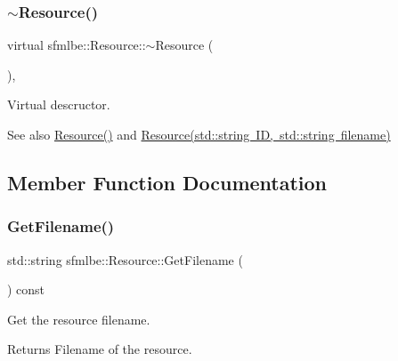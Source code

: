 \subsubsection{\texorpdfstring{$\sim$\+Resource()}{~Resource()}}
{\footnotesize\ttfamily virtual sfmlbe\+::\+Resource\+::$\sim$\+Resource (\begin{DoxyParamCaption}{ }\end{DoxyParamCaption})\hspace{0.3cm}{\ttfamily [inline]}, {\ttfamily [virtual]}}



Virtual descructor. 

\begin{DoxySeeAlso}{See also}
\mbox{\hyperlink{classsfmlbe_1_1_resource_afc4c45a3b69da3904ab98d8096a5dbf6}{Resource()}} and \mbox{\hyperlink{classsfmlbe_1_1_resource_a93030eb6f15353680a352fe10b204842}{Resource(std\+::string I\+D, std\+::string filename)}} 
\end{DoxySeeAlso}


\subsection{Member Function Documentation}
\mbox{\label{classsfmlbe_1_1_resource_ae76151a96999e65307a625d1b57cdc80}} 
\subsubsection{\texorpdfstring{Get\+Filename()}{GetFilename()}}
{\footnotesize\ttfamily std\+::string sfmlbe\+::\+Resource\+::\+Get\+Filename (\begin{DoxyParamCaption}{ }\end{DoxyParamCaption}) const\hspace{0.3cm}{\ttfamily [inline]}}



Get the resource filename. 

\begin{DoxyReturn}{Returns}
Filename of the resource. 
\end{DoxyReturn}
\mbox{\label{classsfmlbe_1_1_resource_ae1fb20f1b0e913db9714be96612556c0}} 
